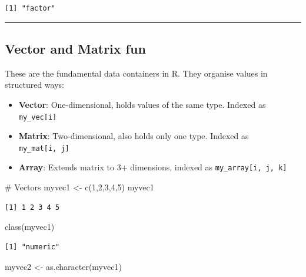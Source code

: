 \documentclass[
  letterpaper,
  DIV=11,
  numbers=noendperiod]{scrartcl}
\newenvironment{Shaded}{\begin{snugshade}}{\end{snugshade}}
\newcommand{\CommentTok}[1]{\textcolor[rgb]{0.37,0.37,0.37}{#1}}
\newcommand{\DecValTok}[1]{\textcolor[rgb]{0.68,0.00,0.00}{#1}}
\newcommand{\FunctionTok}[1]{\textcolor[rgb]{0.28,0.35,0.67}{#1}}
\newcommand{\NormalTok}[1]{\textcolor[rgb]{0.00,0.23,0.31}{#1}}
\newcommand{\OtherTok}[1]{\textcolor[rgb]{0.00,0.23,0.31}{#1}}
\providecommand{\tightlist}{%
  \setlength{\itemsep}{0pt}\setlength{\parskip}{0pt}}\usepackage{longtable,booktabs,array}
\begin{document}
\begin{verbatim}
[1] "factor"
\end{verbatim}

\begin{center}\rule{0.5\linewidth}{0.5pt}\end{center}

\subsection{Vector and Matrix fun}\label{vector-and-matrix-fun}

These are the fundamental data containers in R. They organise values in
structured ways:

\begin{itemize}
\tightlist
\item
  \textbf{Vector}: One-dimensional, holds values of the same type.
  Indexed as \texttt{my\_vec{[}i{]}}
\item
  \textbf{Matrix}: Two-dimensional, also holds only one type. Indexed as
  \texttt{my\_mat{[}i,\ j{]}}
\item
  \textbf{Array}: Extends matrix to 3+ dimensions, indexed as
  \texttt{my\_array{[}i,\ j,\ k{]}}
\end{itemize}

\begin{Shaded}
\begin{Highlighting}[]
\CommentTok{\# Vectors}
\NormalTok{myvec1 }\OtherTok{\textless{}{-}} \FunctionTok{c}\NormalTok{(}\DecValTok{1}\NormalTok{,}\DecValTok{2}\NormalTok{,}\DecValTok{3}\NormalTok{,}\DecValTok{4}\NormalTok{,}\DecValTok{5}\NormalTok{) }
\NormalTok{myvec1}
\end{Highlighting}
\end{Shaded}

\begin{verbatim}
[1] 1 2 3 4 5
\end{verbatim}

\begin{Shaded}
\begin{Highlighting}[]
\FunctionTok{class}\NormalTok{(myvec1) }
\end{Highlighting}
\end{Shaded}

\begin{verbatim}
[1] "numeric"
\end{verbatim}

\begin{Shaded}
\begin{Highlighting}[]
\NormalTok{myvec2 }\OtherTok{\textless{}{-}} \FunctionTok{as.character}\NormalTok{(myvec1) }
\end{Highlighting}
\end{Shaded}
\end{document}
